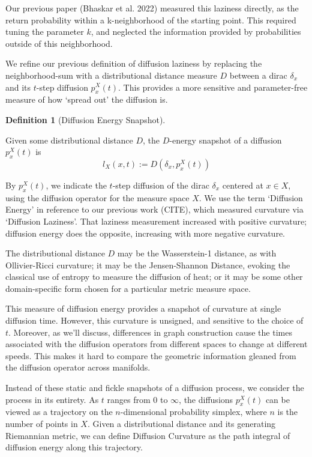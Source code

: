 \documentclass[
  letterpaper,
  DIV=11,
  numbers=noendperiod]{scrartcl}
\theoremstyle{plain}
\theoremstyle{plain}
\theoremstyle{definition}
\theoremstyle{plain}
\theoremstyle{definition}
\newtheorem{definition}{Definition}[section]
\theoremstyle{plain}
\theoremstyle{remark}
\begin{document}
Our previous paper (Bhaskar et al. 2022) measured this laziness
directly, as the return probability within a k-neighborhood of the
starting point. This required tuning the parameter \(k\), and neglected
the information provided by probabilities outside of this neighborhood.

We refine our previous definition of diffusion laziness by replacing the
neighborhood-sum with a distributional distance measure \(D\) between a
dirac \(\delta_{x}\) and its \(t\)-step diffusion \(p_{x}^X(t)\). This
provides a more sensitive and parameter-free measure of how `spread out'
the diffusion is.

\begin{definition}[Diffusion Energy
Snapshot]\protect\hypertarget{def-energy-of-diffusion}{}\label{def-energy-of-diffusion}

Given some distributional distance \(D\), the \(D\)-energy snapshot of a
diffusion \(p_{x}^X(t)\) is \[
l_{X}(x,t) := D\left(\delta_x, p_x^X(t)\right)
\]

\end{definition}

By \(p_{x}^X(t)\), we indicate the \(t\)-step diffusion of the dirac
\(\delta_{x}\) centered at \(x \in X\), using the diffusion operator for
the measure space \(X\). We use the term `Diffusion Energy' in reference
to our previous work (CITE), which measured curvature via `Diffusion
Laziness'. That laziness measurement increased with positive curvature;
diffusion energy does the opposite, increasing with more negative
curvature.

The distributional distance \(D\) may be the Wasserstein-1 distance, as
with Ollivier-Ricci curvature; it may be the Jensen-Shannon Distance,
evoking the classical use of entropy to measure the diffusion of heat;
or it may be some other domain-specific form chosen for a particular
metric measure space.

This measure of diffusion energy provides a snapshot of curvature at
single diffusion time. However, this curvature is unsigned, and
sensitive to the choice of \(t\). Moreover, as we'll discuss,
differences in graph construction cause the times associated with the
diffusion operators from different spaces to change at different speeds.
This makes it hard to compare the geometric information gleaned from the
diffusion operator across manifolds.

Instead of these static and fickle snapshots of a diffusion process, we
consider the process in its entirety. As \(t\) ranges from 0 to
\(\infty\), the diffusions \(p_{x}^X(t)\) can be viewed as a trajectory
on the \(n\)-dimensional probability simplex, where \(n\) is the number
of points in \(X\). Given a distributional distance and its generating
Riemannian metric, we can define Diffusion Curvature as the path
integral of diffusion energy along this trajectory.
\end{document}

